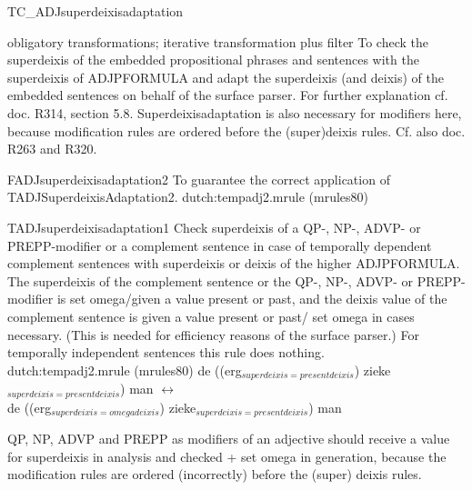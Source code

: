 \begin{mruleclass}{TC\_ADJsuperdeixisadaptation}
\begin{classdescr}
\kind obligatory transformations; iterative transformation plus filter
\classtask  To check the superdeixis of the embedded propositional phrases and 
sentences with the superdeixis of ADJPFORMULA and adapt the superdeixis (and 
deixis) of the embedded sentences on behalf of the surface parser. 
\classremarks
For further 
explanation cf. doc. R314, section 5.8. 
Superdeixisadaptation is also necessary for 
modifiers here, because modification rules are ordered before the (super)deixis 
rules.
Cf. also doc. R263 and R320.

\begin{filters}
\begin{member}
 FADJsuperdeixisadaptation2
 To guarantee the correct application of TADJSuperdeixisAdaptation2.
\file dutch:tempadj2.mrule (mrules80)
\end{member}
\end{filters}

\nospeedrules

\noplannedrules

\norulesnotince

\end{classdescr}

\begin{members}
\begin{member}
 TADJsuperdeixisadaptation1
 Check superdeixis of a QP-, NP-, ADVP- or PREPP-modifier or a
complement sentence 
in case of temporally dependent complement 
sentences with superdeixis or 
deixis of the higher ADJPFORMULA. The superdeixis of the complement sentence or 
the QP-, NP-, ADVP- or PREPP-modifier is set omega/given a 
value present or past, and the deixis value of the complement sentence 
is given a value present or past/ 
set omega in cases necessary. (This is needed for efficiency 
reasons of the surface parser.) For temporally independent sentences this rule 
does nothing. \\
\file dutch:tempadj2.mrule (mrules80)
\semantics \nosemantics
\example\mbox{}
de ((erg$_{superdeixis=presentdeixis}$) zieke$_{superdeixis=presentdeixis}$) man
$\leftrightarrow$\\
de ((erg$_{superdeixis=omegadeixis}$) zieke$_{superdeixis=presentdeixis}$) man
\remarks\mbox{}

QP, NP, ADVP and PREPP as modifiers of an adjective should receive 
a  value for superdeixis in analysis and checked + set omega in generation, 
because the modification rules are ordered (incorrectly) before the (super)
deixis rules.


\end{member}
\end{members}
\end{mruleclass}
